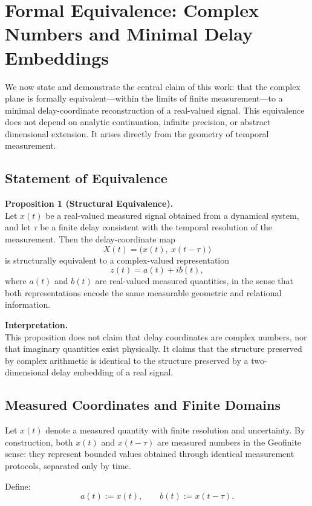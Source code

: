 \documentclass[12pt]{book}  %
\begin{document}
\chapter{Formal Equivalence: Complex Numbers and Minimal Delay Embeddings}

We now state and demonstrate the central claim of this work: that the complex plane is formally equivalent—within the limits of finite measurement—to a minimal delay-coordinate reconstruction of a real-valued signal. This equivalence does not depend on analytic continuation, infinite precision, or abstract dimensional extension. It arises directly from the geometry of temporal measurement.

\section*{Statement of Equivalence}

\textbf{Proposition 1 (Structural Equivalence).}\\
Let \( x(t) \) be a real-valued measured signal obtained from a dynamical system, and let \( \tau \) be a finite delay consistent with the temporal resolution of the measurement. Then the delay-coordinate map
\[
X(t) = \bigl( x(t),\ x(t - \tau) \bigr)
\]
is structurally equivalent to a complex-valued representation
\[
z(t) = a(t) + i b(t),
\]
where \( a(t) \) and \( b(t) \) are real-valued measured quantities, in the sense that both representations encode the same measurable geometric and relational information.

\textbf{Interpretation.}\\
This proposition does not claim that delay coordinates are complex numbers, nor that imaginary quantities exist physically. It claims that the structure preserved by complex arithmetic is identical to the structure preserved by a two-dimensional delay embedding of a real signal.

\section*{Measured Coordinates and Finite Domains}

Let \( x(t) \) denote a measured quantity with finite resolution and uncertainty. By construction, both \( x(t) \) and \( x(t - \tau) \) are measured numbers in the Geofinite sense: they represent bounded values obtained through identical measurement protocols, separated only by time.

Define:
\[
a(t) := x(t),\qquad b(t) := x(t - \tau).
\]
\end{document}
